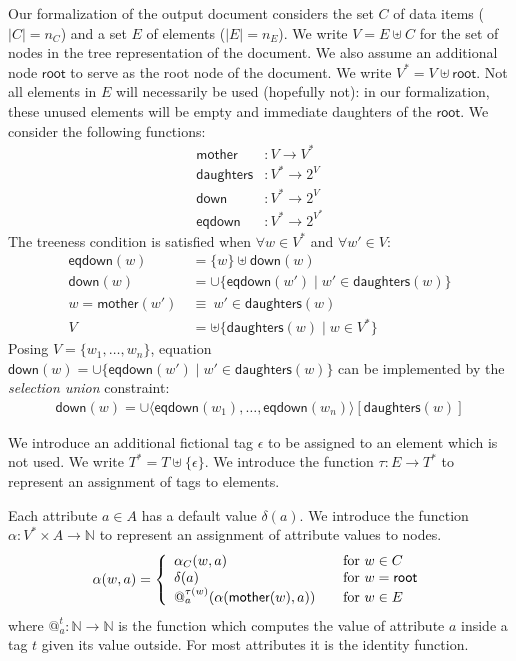 \documentclass{article}
\makeatletter
\newcommand{\NAT}{{\mathbb N}}
\newcommand{\SET}[1]{{\{{#1}\}}}
\newcommand{\TO}{\rightarrow}
\newcommand{\ROOT}{{\textsf{root}}}
\newcommand{\MOTHER}{{\textsf{mother}}}
\newcommand{\DAUGHTERS}{{\textsf{daughters}}}
\newcommand{\DOWN}{{\textsf{down}}}
\newcommand{\EQDOWN}{{\textsf{eqdown}}}
\newcommand{\UNION}{\cup}
\newcommand{\TUP}[1]{{\langle{#1}\rangle}}
\newcommand{\EPS}{\epsilon}
\newcommand{\AT}[2]{@^{#1}_{#2}}
\makeatother
\begin{document}
Our formalization of the output document considers the set $C$ of data
items ($|C|=n_C$) and a set $E$ of elements ($|E|=n_E$).  We write
$V=E\uplus C$ for the set of nodes in the tree representation of the
document.  We also assume an additional node $\ROOT$ to serve as the
root node of the document.  We write $V^*=V\uplus\ROOT$.  Not all
elements in $E$ will necessarily be used (hopefully not): in our
formalization, these unused elements will be empty and immediate
daughters of the $\ROOT$.  We consider the following functions:
\begin{align*}
\MOTHER &: V\TO V^*\\
\DAUGHTERS &: V^*\TO 2^V\\
\DOWN &: V^*\TO 2^V\\
\EQDOWN &: V^*\TO 2^{V^*}
\end{align*}
The treeness condition is satisfied when $\forall w\in V^*$ and
$\forall w'\in V$:
\begin{align*}
\EQDOWN(w)&=\SET{w}\uplus\DOWN(w)\\
\DOWN(w)&={\UNION}\SET{\EQDOWN(w')\mid w'\in\DAUGHTERS(w)}\\
w=\MOTHER(w')\ &\equiv\ w'\in\DAUGHTERS(w)\\
V&={\uplus}\SET{\DAUGHTERS(w)\mid w\in V^*}
\end{align*}
Posing $V=\SET{w_1,\ldots,w_n}$,
equation $\DOWN(w)={\UNION}\SET{\EQDOWN(w')\mid w'\in\DAUGHTERS(w)}$
can be implemented by the \emph{selection union} constraint:
\begin{gather*}
\DOWN(w)={\UNION}\TUP{\EQDOWN(w_1),\ldots,\EQDOWN(w_n)}[\DAUGHTERS(w)]
\end{gather*}

We introduce an additional fictional tag $\EPS$ to be assigned to an
element which is not used.  We write $T^*=T\uplus\SET{\EPS}$.  We
introduce the function $\tau:E\TO T^*$ to represent an assignment of
tags to elements.

Each attribute $a\in A$ has a default value $\delta(a)$.  We introduce
the function $\alpha:V^*\times A\TO\NAT$ to represent an assignment of
attribute values to nodes.
\begin{gather*}
\alpha(w,a) = \left\{
\begin{array}{l@{\qquad}l}
\alpha_C(w,a) & \text{for } w\in C\\
\delta(a) & \text{for } w=\ROOT\\
\AT{\tau(w)}{a}(\alpha(\MOTHER(w),a)) & \text{for } w\in E
\end{array}
\right.
\end{gather*}
where $\AT{t}{a}:\NAT\TO\NAT$ is the function which computes the value
of attribute $a$ inside a tag $t$ given its value outside.  For most
attributes it is the identity function.
\end{document}
